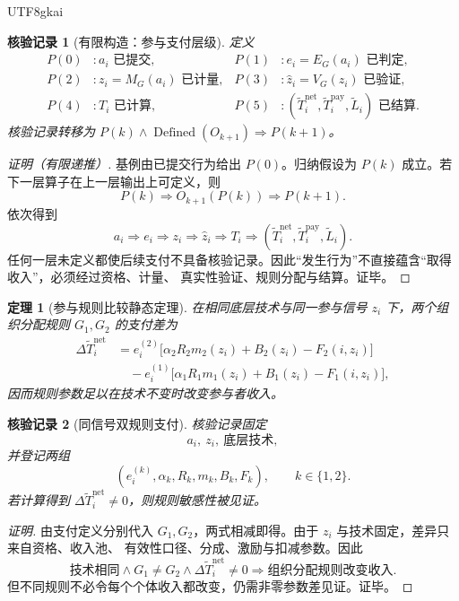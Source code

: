 \documentclass[12pt,a4paper,openany]{report}
\newtheorem{theorem}{定理}[chapter]
\newtheorem{Certificate}{核验记录}[chapter]
\begin{document}
\begin{CJK*}{UTF8}{gkai}
\begin{Certificate}[有限构造：参与支付层级]
\label{cert:platform-payment-chain}
定义
\[
\begin{aligned}
P(0)&:a_i\text{ 已提交},&
P(1)&:e_i=E_G(a_i)\text{ 已判定},\\
P(2)&:z_i=M_G(a_i)\text{ 已计量},&
P(3)&:\widehat z_i=V_G(z_i)\text{ 已验证},\\
P(4)&:T_i\text{ 已计算},&
P(5)&:(\widetilde T_i^{\mathrm{net}},\widetilde T_i^{\mathrm{pay}},\widetilde L_i)\text{ 已结算}.
\end{aligned}
\]
核验记录转移为 \(P(k)\wedge\operatorname{Defined}(O_{k+1})\Rightarrow P(k+1)\)。
\end{Certificate}

\begin{proof}[证明（有限递推）]
\hfill\par\noindent
基例由已提交行为给出 \(P(0)\)。归纳假设为 \(P(k)\) 成立。若下一层算子在上一层输出上可定义，则
\[
  P(k)\Longrightarrow O_{k+1}(P(k))\Longrightarrow P(k+1).
\]
依次得到
\[
  a_i\Longrightarrow e_i\Longrightarrow z_i
  \Longrightarrow\widehat z_i\Longrightarrow T_i
  \Longrightarrow(\widetilde T_i^{\mathrm{net}},\widetilde T_i^{\mathrm{pay}},\widetilde L_i).
\]
任何一层未定义都使后续支付不具备核验记录。因此“发生行为”不直接蕴含“取得收入”，必须经过资格、计量、
真实性验证、规则分配与结算。证毕。
\end{proof}

\begin{theorem}[参与规则比较静态定理]
\label{thm:platform-rule-comparative-static}
在相同底层技术与同一参与信号 \(z_i\) 下，两个组织分配规则 \(G_1,G_2\) 的支付差为
\[
\begin{aligned}
\Delta\widetilde T_i^{\mathrm{net}}
&=
e_i^{(2)}\!
\bigl[\alpha_2R_2m_2(z_i)+B_2(z_i)-F_2(i,z_i)\bigr]\\
&\quad-
e_i^{(1)}\!
\bigl[\alpha_1R_1m_1(z_i)+B_1(z_i)-F_1(i,z_i)\bigr],
\end{aligned}
\]
因而规则参数足以在技术不变时改变参与者收入。
\end{theorem}

\begin{Certificate}[同信号双规则支付]
核验记录固定
\[
  a_i,\ z_i,\ \text{底层技术},
\]
并登记两组
\[
  (e_i^{(k)},\alpha_k,R_k,m_k,B_k,F_k),
  \qquad k\in\{1,2\}.
\]
若计算得到 \(\Delta\widetilde T_i^{\mathrm{net}}\ne0\)，则规则敏感性被见证。
\end{Certificate}

\begin{proof}[证明]
由支付定义分别代入 \(G_1,G_2\)，两式相减即得。由于 \(z_i\) 与技术固定，差异只来自资格、收入池、
有效性口径、分成、激励与扣减参数。因此
\[
  \text{技术相同}\wedge G_1\ne G_2
  \wedge\Delta\widetilde T_i^{\mathrm{net}}\ne0
  \Longrightarrow
  \text{组织分配规则改变收入}.
\]
但不同规则不必令每个个体收入都改变，仍需非零参数差见证。证毕。
\end{proof}


\end{CJK*}
\end{document}

